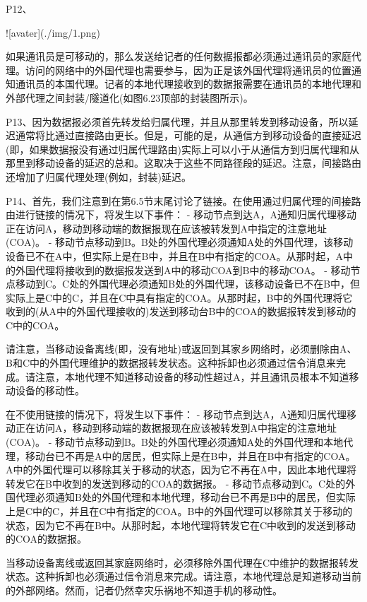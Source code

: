 \documentclass[11pt,UTF8,twoside]{article}
\begin{document}
{		P12、
		
		![avater](./img/1.png)
		
		如果通讯员是可移动的，那么发送给记者的任何数据报都必须通过通讯员的家庭代理。访问的网络中的外国代理也需要参与，因为正是该外国代理将通讯员的位置通知通讯员的本国代理。记者的本地代理接收到的数据报需要在通讯员的本地代理和外部代理之间封装/隧道化(如图6.23顶部的封装图所示)。
		
		P13、因为数据报必须首先转发给归属代理，并且从那里转发到移动设备，所以延迟通常将比通过直接路由更长。但是，可能的是，从通信方到移动设备的直接延迟(即，如果数据报没有通过归属代理路由)实际上可以小于从通信方到归属代理和从那里到移动设备的延迟的总和。这取决于这些不同路径段的延迟。注意，间接路由还增加了归属代理处理(例如，封装)延迟。
		
		P14、首先，我们注意到在第6.5节末尾讨论了链接。在使用通过归属代理的间接路由进行链接的情况下，将发生以下事件：
		- 移动节点到达A，A通知归属代理移动正在访问A，移动到移动端的数据报现在应该被转发到A中指定的注意地址(COA)。
		- 移动节点移动到B。B处的外国代理必须通知A处的外国代理，该移动设备已不在A中，但实际上是在B中，并且在B中有指定的COA。从那时起，A中的外国代理将接收到的数据报发送到A中的移动COA到B中的移动COA。
		- 移动节点移动到C。C处的外国代理必须通知B处的外国代理，该移动设备已不在B中，但实际上是C中的C，并且在C中具有指定的COA。从那时起，B中的外国代理将它收到的(从A中的外国代理接收的)发送到移动台B中的COA的数据报转发到移动的C中的COA。
		
		请注意，当移动设备离线(即，没有地址)或返回到其家乡网络时，必须删除由A、B和C中的外国代理维护的数据报转发状态。这种拆卸也必须通过信令消息来完成。请注意，本地代理不知道移动设备的移动性超过A，并且通讯员根本不知道移动设备的移动性。
		
		在不使用链接的情况下，将发生以下事件：
		- 移动节点到达A，A通知归属代理移动正在访问A，移动到移动端的数据报现在应该被转发到A中指定的注意地址(COA)。
		- 移动节点移动到B。B处的外国代理必须通知A处的外国代理和本地代理，移动台已不再是A中的居民，但实际上是在B中，并且在B中有指定的COA。A中的外国代理可以移除其关于移动的状态，因为它不再在A中，因此本地代理将转发它在B中收到的发送到移动的COA的数据报。
		- 移动节点移动到C。C处的外国代理必须通知B处的外国代理和本地代理，移动台已不再是B中的居民，但实际上是C中的C，并且在C中有指定的COA。B中的外国代理可以移除其关于移动的状态，因为它不再在B中。从那时起，本地代理将转发它在C中收到的发送到移动的COA的数据报。
		
		当移动设备离线或返回其家庭网络时，必须移除外国代理在C中维护的数据报转发状态。这种拆卸也必须通过信令消息来完成。请注意，本地代理总是知道移动当前的外部网络。然而，记者仍然幸灾乐祸地不知道手机的移动性。
		
}
\end{document}
